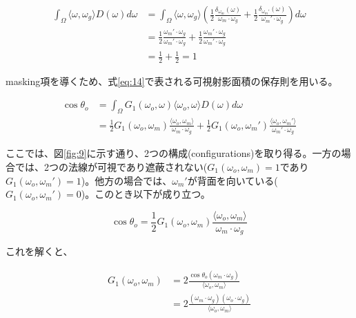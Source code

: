 \documentclass[a4j,xelatex,ja=standard]{bxjsarticle}
\begin{document}
\begin{equation}
    \begin{split}
        \int_{\Omega} \langle \omega, \omega_g \rangle D(\omega) d\omega
        &= \int_{\Omega} \langle \omega, \omega_g \rangle \left( \frac{1}{2} \frac{\delta_{\omega_m}(\omega)}{\omega_m \cdot \omega_g} + \frac{1}{2} \frac{\delta_{\omega_m'}(\omega)}{\omega_m' \cdot \omega_g} \right) d\omega \\
        &= \frac{1}{2} \frac{\omega_m' \cdot \omega_g}{\omega_m' \cdot \omega_g} + \frac{1}{2} \frac{\omega_m' \cdot \omega_g}{\omega_m' \cdot \omega_g} \\
        &= \frac{1}{2} + \frac{1}{2} = 1
    \end{split}
    \label{eq:45}
\end{equation}

masking項を導くため、式\eqref{eq:14}で表される可視射影面積の保存則を用いる。

\begin{equation}
    \begin{split}
        \cos\theta_o
        &= \int_{\Omega} G_1(\omega_o, \omega) \langle \omega_o, \omega \rangle D(\omega) d\omega \\
        &= \frac{1}{2} G_1(\omega_o, \omega_m) \frac{\langle \omega_o, \omega_m \rangle}{\omega_m \cdot \omega_g} + \frac{1}{2} G_1(\omega_o, \omega_m') \frac{\langle \omega_o, \omega_m' \rangle}{\omega_m' \cdot \omega_g}
    \end{split}
    \label{eq:46}
\end{equation}

ここでは、図\ref{fig:9}に示す通り、2つの構成(configurations)を取り得る。一方の場合では、2つの法線が可視であり遮蔽されない($G_1(\omega_o, \omega_m) = 1$であり$G_1(\omega_o, \omega_m') = 1$)。他方の場合では、$\omega_m'$が背面を向いている($G_1(\omega_o, \omega_m') = 0$)。このとき以下が成り立つ。

\begin{equation}
    \cos\theta_o = \frac{1}{2}G_1(\omega_o, \omega_m) \frac{\langle \omega_o, \omega_m \rangle}{\omega_m \cdot \omega_g}
    \label{eq:47}
\end{equation}

これを解くと、

\begin{equation}
    \begin{split}
        G_1(\omega_o, \omega_m)
        &= 2 \frac{\cos\theta_o (\omega_m \cdot \omega_g)}{\langle \omega_o, \omega_m \rangle} \\
        &= 2 \frac{(\omega_m \cdot \omega_g) (\omega_o \cdot \omega_g)}{\langle \omega_o, \omega_m \rangle}
    \end{split}
    \label{eq:48}
\end{equation}
\end{document}

